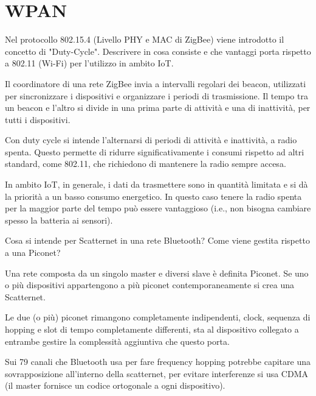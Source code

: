 \section{WPAN}

\begin{questions}
    \question Nel protocollo 802.15.4 (Livello PHY e MAC di ZigBee) viene introdotto il concetto di "Duty-Cycle". Descrivere in cosa consiste e che vantaggi porta rispetto a 802.11 (Wi-Fi) per l'utilizzo in ambito IoT.
    
    \begin{solution}
        Il coordinatore di una rete ZigBee invia a intervalli regolari dei beacon, utilizzati per sincronizzare i dispositivi e organizzare i periodi di trasmissione. Il tempo tra un beacon e l'altro si divide in una prima parte di attività e una di inattività, per tutti i dispositivi. 
        
        Con duty cycle si intende l'alternarsi di periodi di attività e inattività, a radio spenta. Questo permette di ridurre significativamente i consumi rispetto ad altri standard, come 802.11, che richiedono di mantenere la radio sempre accesa. 
        
        In ambito IoT, in generale, i dati da trasmettere sono in quantità limitata e si dà la priorità a un basso consumo energetico. In questo caso tenere la radio spenta per la maggior parte del tempo può essere vantaggioso (i.e., non bisogna cambiare spesso la batteria ai sensori).
    \end{solution}
    
    \question Cosa si intende per Scatternet in una rete Bluetooth? Come viene gestita rispetto a una Piconet?
    
    \begin{solution}
        Una rete composta da un singolo master e diversi slave è definita Piconet. Se uno o più dispositivi appartengono a più piconet contemporaneamente si crea una Scatternet. 
        
        Le due (o più) piconet rimangono completamente indipendenti, clock, sequenza di hopping e slot di tempo completamente differenti, sta al dispositivo collegato a entrambe gestire la complessità aggiuntiva che questo porta.
        
        Sui 79 canali che Bluetooth usa per fare frequency hopping potrebbe capitare una sovrapposizione all'interno della scatternet, per evitare interferenze si usa CDMA (il master fornisce un codice ortogonale a ogni dispositivo).
    \end{solution}
    

\end{questions}

